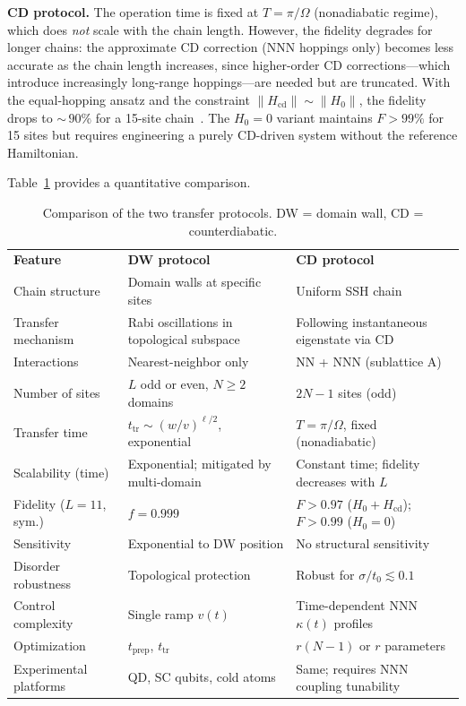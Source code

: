 \documentclass[
  reprint,
  amsmath,
  amssymb,
  aps,
  prb,
  floatfix,
  longbibliography,
]{revtex4-2}
\newcommand{\ttr}{t_{\mathrm{tr}}}
\newcommand{\tprep}{t_{\mathrm{prep}}}
\begin{document}
\textbf{CD protocol.}
The operation time is fixed at $T = \pi/\Omega$ (nonadiabatic regime), which
does \emph{not} scale with the chain length. However, the fidelity degrades
for longer chains: the approximate CD correction (NNN hoppings only)
becomes less accurate as the chain length increases, since higher-order CD corrections---which
introduce increasingly long-range hoppings---are needed but are truncated.
With the equal-hopping ansatz and the constraint
$\|H_{\mathrm{cd}}\| \sim \|H_0\|$, the fidelity drops to ${\sim}\,90\%$
for a 15-site chain~\cite{Romero2024}. The $H_0 = 0$ variant maintains
$F > 99\%$ for 15 sites but requires engineering a purely CD-driven
system without the reference Hamiltonian.

Table~\ref{tab:comparison} provides a quantitative comparison.

\begin{table}[t]
  \caption{Comparison of the two transfer protocols. DW = domain wall,
  CD = counterdiabatic.}
  \label{tab:comparison}
  \begin{ruledtabular}
  \begin{tabular}{lll}
    \textbf{Feature} & \textbf{DW protocol}~\cite{Zurita2023}
    & \textbf{CD protocol}~\cite{Romero2024} \\
    \colrule
    Chain structure & Domain walls at specific sites &
    Uniform SSH chain \\
    Transfer mechanism & Rabi oscillations in topological subspace &
    Following instantaneous eigenstate via CD \\
    Interactions & Nearest-neighbor only &
    NN + NNN (sublattice A) \\
    Number of sites & $L$ odd or even, $N \geq 2$ domains &
    $2N - 1$ sites (odd) \\
    Transfer time & $\ttr \sim (w/v)^{\ell/2}$, exponential &
    $T = \pi/\Omega$, fixed (nonadiabatic) \\
    Scalability (time) & Exponential; mitigated by multi-domain &
    Constant time; fidelity decreases with $L$ \\
    Fidelity ($L = 11$, sym.) & $f = 0.999$ &
    $F > 0.97$ ($H_0{+}H_{\mathrm{cd}}$); $F{>}0.99$ ($H_0{=}0$) \\
    Sensitivity & Exponential to DW position &
    No structural sensitivity \\
    Disorder robustness & Topological protection &
    Robust for $\sigma/t_0 \lesssim 0.1$ \\
    Control complexity & Single ramp $v(t)$ &
    Time-dependent NNN $\kappa(t)$ profiles \\
    Optimization & $\tprep$, $\ttr$ & $r(N{-}1)$ or $r$ parameters \\
    Experimental platforms & QD, SC qubits, cold atoms &
    Same; requires NNN coupling tunability \\
  \end{tabular}
  \end{ruledtabular}
\end{table}
\end{document}
